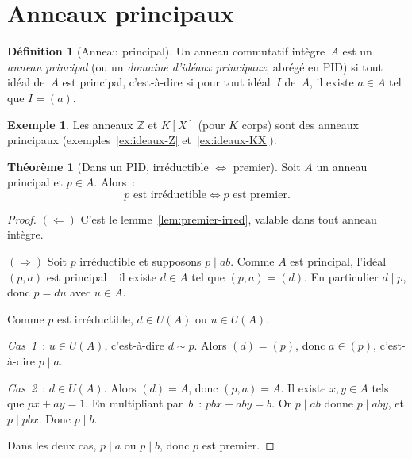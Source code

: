 \documentclass[12pt,a4paper,openany]{book}
\theoremstyle{definition}
\newtheorem{definition}{Définition}[chapter]
\newtheorem{theoreme}{Théorème}[chapter]
\newtheorem{exemple}{Exemple}[chapter]
\newcommand{\Z}{\mathbb{Z}}
\begin{document}
\section{Anneaux principaux}\label{sec:anneaux-principaux}

\begin{definition}[Anneau principal]\label{def:anneau-principal}
Un anneau commutatif intègre~$A$ est un \emph{anneau principal}
(ou un \emph{domaine d'idéaux principaux}, abrégé en PID)
si tout idéal de~$A$ est principal, c'est-à-dire si pour tout
idéal~$I$ de~$A$, il existe $a \in A$ tel que $I = (a)$.
\end{definition}

\begin{exemple}\label{ex:anneaux-principaux}
Les anneaux $\Z$ et $K[X]$ (pour $K$ corps) sont des anneaux principaux
(exemples~\ref{ex:ideaux-Z} et~\ref{ex:ideaux-KX}).
\end{exemple}

\begin{theoreme}[Dans un PID, irréductible $\iff$ premier]%
\label{thm:irred-premier-PID}
Soit $A$ un anneau principal et $p \in A$. Alors~:
\[
  p \text{ est irréductible} \iff p \text{ est premier}.
\]
\end{theoreme}

\begin{proof}
$(\Leftarrow)$\; C'est le lemme~\ref{lem:premier-irred}, valable dans
tout anneau intègre.

$(\Rightarrow)$\; Soit $p$ irréductible et supposons $p \mid ab$.
Comme $A$ est principal, l'idéal $(p, a)$ est principal~: il existe
$d \in A$ tel que $(p, a) = (d)$. En particulier $d \mid p$, donc
$p = du$ avec $u \in A$.

Comme $p$ est irréductible, $d \in U(A)$ ou $u \in U(A)$.

\emph{Cas~1}~: $u \in U(A)$, c'est-à-dire $d \sim p$. Alors
$(d) = (p)$, donc $a \in (p)$, c'est-à-dire $p \mid a$.

\emph{Cas~2}~: $d \in U(A)$. Alors $(d) = A$, donc $(p, a) = A$.
Il existe $x, y \in A$ tels que $px + ay = 1$. En multipliant par~$b$~:
$pbx + aby = b$. Or $p \mid ab$ donne $p \mid aby$, et $p \mid pbx$.
Donc $p \mid b$.

Dans les deux cas, $p \mid a$ ou $p \mid b$, donc $p$ est premier.
\end{proof}
\end{document}
